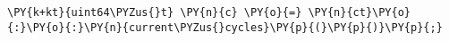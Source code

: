  {\footnotesize
 \begin{Verbatim}[commandchars=\\\{\}]
 \PY{k+kt}{uint64\PYZus{}t} \PY{n}{c} \PY{o}{=} \PY{n}{ct}\PY{o}{:}\PY{o}{:}\PY{n}{current\PYZus{}cycles}\PY{p}{(}\PY{p}{)}\PY{p}{;}
 \end{Verbatim}
 }
